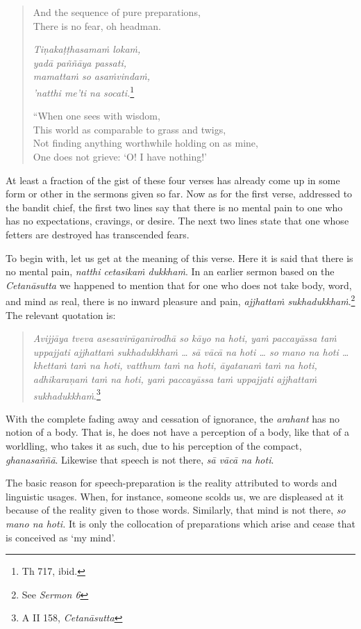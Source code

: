 \begin{quote}
And the sequence of pure preparations,\\
There is no fear, oh headman.

\emph{Tiṇakaṭṭhasamaṁ lokaṁ,}\\
\emph{yadā paññāya passati,}\\
\emph{mamattaṁ so asaṁvindaṁ,}\\
\emph{'natthi me'ti na socati.}\footnote{Th 717, ibid.}

``When one sees with wisdom,\\
This world as comparable to grass and twigs,\\
Not finding anything worthwhile holding on as mine,\\
One does not grieve: `O! I have nothing!'
\end{quote}

At least a fraction of the gist of these four verses has already come up in some form or other in the sermons given so far. Now as for the first verse, addressed to the bandit chief, the first two lines say that there is no mental pain to one who has no expectations, cravings, or desire. The next two lines state that one whose fetters are destroyed has transcended fears.

To begin with, let us get at the meaning of this verse. Here it is said that there is no mental pain, \emph{natthi cetasikaṁ dukkhaṁ}. In an earlier sermon based on the \emph{Cetanāsutta} we happened to mention that for one who does not take body, word, and mind as real, there is no inward pleasure and pain, \emph{ajjhattaṁ sukhadukkhaṁ}.\footnote{See \emph{Sermon 6}} The relevant quotation is:

\begin{quote}
\emph{Avijjāya tveva asesavirāganirodhā so kāyo na hoti, yaṁ paccayāssa taṁ uppajjati ajjhattaṁ sukhadukkhaṁ \ldots{} sā vācā na hoti \ldots{} so mano na hoti \ldots{} khettaṁ taṁ na hoti, vatthum taṁ na hoti, āyatanaṁ taṁ na hoti, adhikaraṇaṁ taṁ na hoti, yaṁ paccayāssa taṁ uppajjati ajjhattaṁ sukhadukkhaṁ}.\footnote{A II 158, \emph{Cetanāsutta}}
\end{quote}

With the complete fading away and cessation of ignorance, the \emph{arahant} has no notion of a body. That is, he does not have a perception of a body, like that of a worldling, who takes it as such, due to his perception of the compact, \emph{ghanasaññā}. Likewise that speech is not there, \emph{sā vācā na hoti}.

The basic reason for speech-preparation is the reality attributed to words and linguistic usages. When, for instance, someone scolds us, we are displeased at it because of the reality given to those words. Similarly, that mind is not there, \emph{so mano na hoti.} It is only the collocation of preparations which arise and cease that is conceived as `my mind'.

